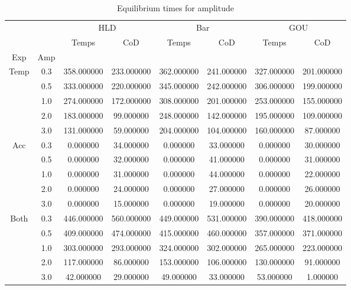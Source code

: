 \begin{table}[h]
\centering
\caption{Equilibrium times for amplitude}
\label{table:5}
\begin{tabular}{cccccccc}
\toprule
 &  & \multicolumn{2}{c}{HLD} & \multicolumn{2}{c}{Bar} & \multicolumn{2}{c}{GOU} \\
 &  & Temps & CoD & Temps & CoD & Temps & CoD \\
Exp & Amp &  &  &  &  &  &  \\
\midrule
\multirow[c]{5}{*}{Temp} & 0.3 & 358.000000 & 233.000000 & 362.000000 & 241.000000 & 327.000000 & 201.000000 \\
 & 0.5 & 333.000000 & 220.000000 & 345.000000 & 242.000000 & 306.000000 & 199.000000 \\
 & 1.0 & 274.000000 & 172.000000 & 308.000000 & 201.000000 & 253.000000 & 155.000000 \\
 & 2.0 & 183.000000 & 99.000000 & 248.000000 & 142.000000 & 195.000000 & 109.000000 \\
 & 3.0 & 131.000000 & 59.000000 & 204.000000 & 104.000000 & 160.000000 & 87.000000 \\
\multirow[c]{5}{*}{Acc} & 0.3 & 0.000000 & 34.000000 & 0.000000 & 33.000000 & 0.000000 & 30.000000 \\
 & 0.5 & 0.000000 & 32.000000 & 0.000000 & 41.000000 & 0.000000 & 31.000000 \\
 & 1.0 & 0.000000 & 31.000000 & 0.000000 & 44.000000 & 0.000000 & 22.000000 \\
 & 2.0 & 0.000000 & 24.000000 & 0.000000 & 27.000000 & 0.000000 & 26.000000 \\
 & 3.0 & 0.000000 & 15.000000 & 0.000000 & 19.000000 & 0.000000 & 20.000000 \\
\multirow[c]{5}{*}{Both} & 0.3 & 446.000000 & 560.000000 & 449.000000 & 531.000000 & 390.000000 & 418.000000 \\
 & 0.5 & 409.000000 & 474.000000 & 415.000000 & 460.000000 & 357.000000 & 371.000000 \\
 & 1.0 & 303.000000 & 293.000000 & 324.000000 & 302.000000 & 265.000000 & 223.000000 \\
 & 2.0 & 117.000000 & 86.000000 & 153.000000 & 106.000000 & 130.000000 & 91.000000 \\
 & 3.0 & 42.000000 & 29.000000 & 49.000000 & 33.000000 & 53.000000 & 1.000000 \\
\bottomrule
\end{tabular}
\end{table}
